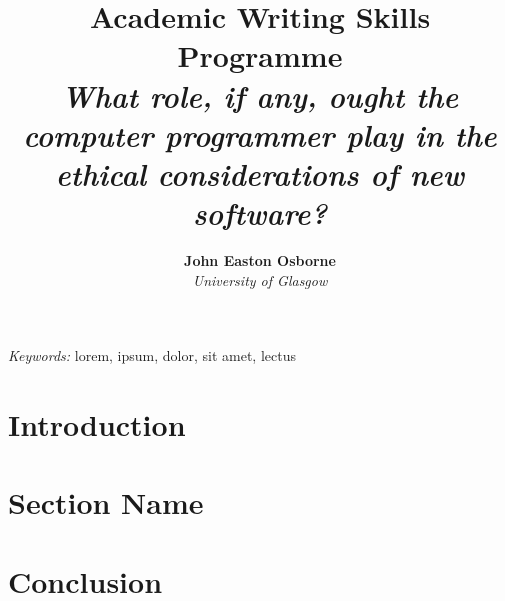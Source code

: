 \documentclass[11pt]{diazessay} %
\title{\textbf{Academic Writing Skills Programme} \\ {\Large\itshape What role, if any, ought the computer programmer play in the ethical considerations of new software?}} %
\author{\textbf{John Easton Osborne} \\ \textit{University of Glasgow}} %
\date{} %
\begin{document}
\maketitle %


\renewcommand{\abstractname}{Summary} %

\begin{abstract}


\end{abstract}

\hspace*{3.6mm}\textit{Keywords:} lorem, ipsum, dolor, sit amet, lectus %

\vspace{30pt} %


\section*{Introduction}



\section*{Section Name}



\section*{Conclusion}


%

%

\end{document}
